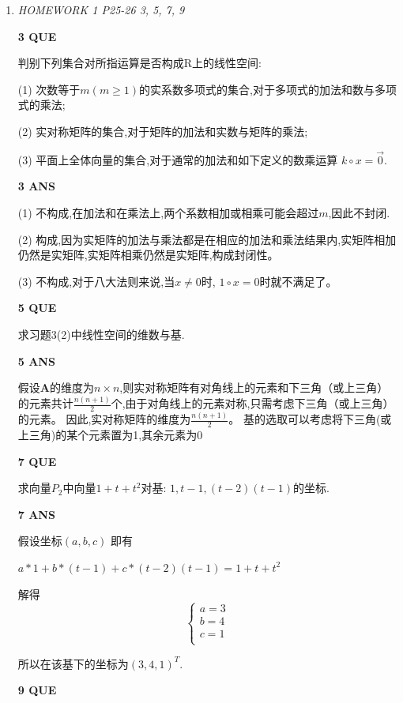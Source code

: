 \documentclass[11pt,letterpaper]{ctexart}
\begin{document}
\begin{enumerate}

 \item \textit{HOMEWORK 1  {P25-26  3, 5, 7, 9}}%

\textbf{3 QUE}
\bigskip

	判别下列集合对所指运算是否构成{R}上的线性空间:

	(1) 次数等于$m(m \geqslant 1)$的实系数多项式的集合,对于多项式的加法和数与多项式的乘法;

	(2) 实对称矩阵的集合,对于矩阵的加法和实数与矩阵的乘法;

	(3) 平面上全体向量的集合,对于通常的加法和如下定义的数乘运算 $k \circ x = \vec{0}$.

\textbf{3 ANS}
\bigskip

	(1) 不构成,在加法和在乘法上,两个系数相加或相乘可能会超过$m$,因此不封闭.
	
	(2) 构成,因为实矩阵的加法与乘法都是在相应的加法和乘法结果内,实矩阵相加仍然是实矩阵,实矩阵相乘仍然是实矩阵,构成封闭性。

	(3) 不构成,对于八大法则来说,当$x \neq 0$时, $1 \circ x = 0$时就不满足了。
	
\textbf{5 QUE}
\bigskip
	
求习题3(2)中线性空间的维数与基.

\textbf{5 ANS}
\bigskip

假设$\mathbf{A}$的维度为$n\times n$,则实对称矩阵有对角线上的元素和下三角（或上三角）
的元素共计$\frac{n(n+1)}{2}$个,由于对角线上的元素对称,只需考虑下三角（或上三角）的元素。
因此,实对称矩阵的维度为$\frac{n(n+1)}{2}$。
基的选取可以考虑将下三角(或上三角)的某个元素置为1,其余元素为0


\textbf{7 QUE}
\bigskip

求向量$P_2$中向量$1 + t + t^2$对基: $1, t - 1, (t - 2)(t - 1)$的坐标.

\textbf{7 ANS}
\bigskip

	假设坐标$(a, b, c)$ 即有

	$a * 1 + b * (t - 1) + c * (t - 2)(t - 1) = 1 + t + t^2 $

	解得 
			\[\begin{cases}
				a = 3\\
				b = 4\\
				c = 1\\
		\end{cases}\]

	所以在该基下的坐标为$(3,4,1)^T$.

\textbf{9 QUE}
\bigskip


\end{enumerate}
\end{document}
